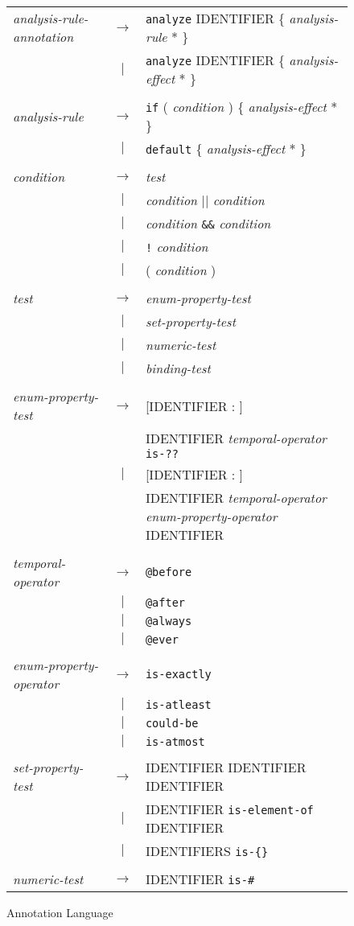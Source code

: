 \documentclass[times, 10pt]{article}
\begin{document}
\begin{figure}
\begin{tabular}[c]{l c l}
{\it analysis-rule-annotation} & $\rightarrow$ & {\tt analyze} IDENTIFIER \{ {\it analysis-rule} * \}\\
& $|$ & {\tt analyze} IDENTIFIER \{ {\it analysis-effect} * \}\\
\\
{\it analysis-rule} & $\rightarrow$ & {\tt if} ( {\it condition} ) \{ {\it analysis-effect} * \} \\
& $|$ & {\tt default} \{ {\it analysis-effect} * \} \\
\\
{\it condition} & $\rightarrow$ & {\it test} \\
& $|$ & {\it condition} {\tt $|$$|$} {\it condition} \\
& $|$ & {\it condition} {\tt \&\&} {\it condition} \\
& $|$ & {\tt !} {\it condition} \\
& $|$ & ( {\it condition} ) \\
\\
{\it test} & $\rightarrow$ & {\it enum-property-test} \\
& $|$ & {\it set-property-test} \\
& $|$ & {\it numeric-test} \\
& $|$ & {\it binding-test} \\
\\
{\it enum-property-test} & $\rightarrow$ & [IDENTIFIER : ] \\
& & IDENTIFIER {\it temporal-operator} {\tt is-??} \\
& $|$ & [IDENTIFIER : ] \\
& & IDENTIFIER {\it temporal-operator} {\it enum-property-operator} IDENTIFIER \\
\\
{\it temporal-operator} & $\rightarrow$ & {\tt @before} \\
& $|$ & {\tt @after} \\
& $|$ & {\tt @always} \\
& $|$ & {\tt @ever} \\
\\
{\it enum-property-operator} & $\rightarrow$ & {\tt is-exactly} \\
& $|$ & {\tt is-atleast} \\
& $|$ & {\tt could-be} \\
& $|$ & {\tt is-atmost} \\
\\
{\it set-property-test} & $\rightarrow$ & IDENTIFIER IDENTIFIER IDENTIFIER \\
& $|$ & IDENTIFIER {\tt is-element-of} IDENTIFIER \\
& $|$ & IDENTIFIERS {\tt is-\{\}} \\
\\
{\it numeric-test} & $\rightarrow$ & IDENTIFIER {\tt is-\#} \\
\end{tabular}
\caption{Annotation Language}
\label{annbnf2}
\end{figure}
\end{document}
